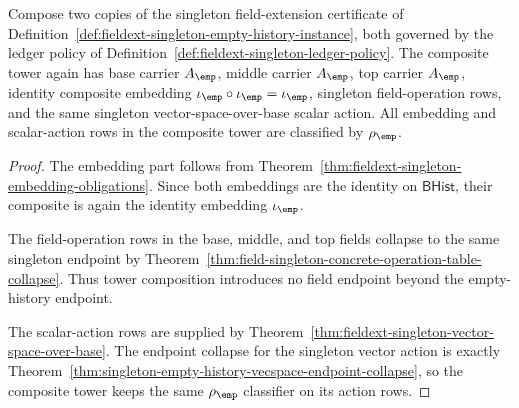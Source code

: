 \begin{theorem}
\label{thm:fieldext-singleton-identity-tower-composition}
Compose two copies of the singleton field-extension certificate of
Definition~\ref{def:fieldext-singleton-empty-history-instance}, both governed
by the ledger policy of Definition~\ref{def:fieldext-singleton-ledger-policy}.
The composite tower again has base carrier $A_{\emp}$, middle carrier
$A_{\emp}$, top carrier $A_{\emp}$, identity composite embedding
$\iota_{\emp}\circ\iota_{\emp}=\iota_{\emp}$, singleton field-operation rows,
and the same singleton vector-space-over-base scalar action. All embedding and
scalar-action rows in the composite tower are classified by $\rho_{\emp}$.
\end{theorem}
\begin{proof}
The embedding part follows from
Theorem~\ref{thm:fieldext-singleton-embedding-obligations}. Since both
embeddings are the identity on $\mathsf{BHist}$, their composite is again the
identity embedding $\iota_{\emp}$.

The field-operation rows in the base, middle, and top fields collapse to the
same singleton endpoint by
Theorem~\ref{thm:field-singleton-concrete-operation-table-collapse}. Thus tower
composition introduces no field endpoint beyond the empty-history endpoint.

The scalar-action rows are supplied by
Theorem~\ref{thm:fieldext-singleton-vector-space-over-base}. The endpoint
collapse for the singleton vector action is exactly
Theorem~\ref{thm:singleton-empty-history-vecspace-endpoint-collapse}, so the
composite tower keeps the same $\rho_{\emp}$ classifier on its action rows.
\end{proof}

